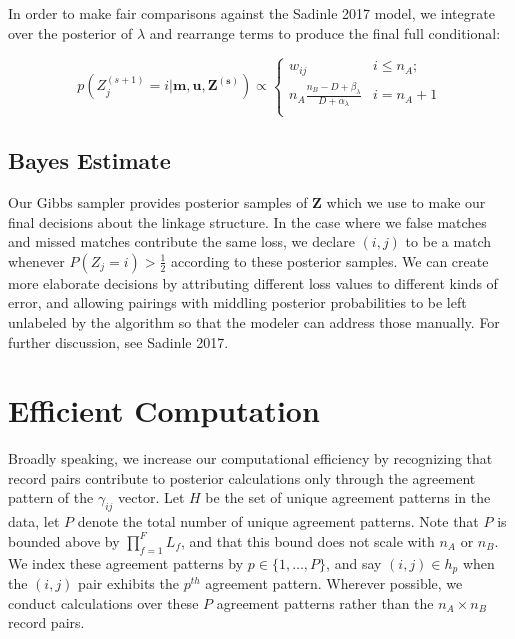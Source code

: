 \documentclass[
  12pt,
]{article}
\begin{document}
In order to make fair comparisons against the Sadinle 2017 model, we
integrate over the posterior of \(\lambda\) and rearrange terms to
produce the final full conditional:

\[p\left(Z_j^{(s+1)}  = i| \mathbf{m}, \mathbf{u}, \mathbf{Z^{(s)}}\right) \propto
\begin{cases} 
    w_{ij}  & i \leq n_A; \\
     n_A \frac{n_B - D + \beta_{\lambda}}{D + \alpha_{\lambda}} & i  = n_A + 1 \\
\end{cases}\]

\hypertarget{bayes-estimate}{%
\subsection{Bayes Estimate}\label{bayes-estimate}}

Our Gibbs sampler provides posterior samples of \(\mathbf{Z}\) which we
use to make our final decisions about the linkage structure. In the case
where we false matches and missed matches contribute the same loss, we
declare \((i,j)\) to be a match whenever \(P(Z_j = i) > \frac{1}{2}\)
according to these posterior samples. We can create more elaborate
decisions by attributing different loss values to different kinds of
error, and allowing pairings with middling posterior probabilities to be
left unlabeled by the algorithm so that the modeler can address those
manually. For further discussion, see Sadinle 2017.

\hypertarget{efficient-computation}{%
\section{Efficient Computation}\label{efficient-computation}}

Broadly speaking, we increase our computational efficiency by
recognizing that record pairs contribute to posterior calculations only
through the agreement pattern of the \(\gamma_{ij}\) vector. Let \(H\)
be the set of unique agreement patterns in the data, let \(P\) denote
the total number of unique agreement patterns. Note that \(P\) is
bounded above by \(\prod_{f=1}^F L_f\), and that this bound does not
scale with \(n_A\) or \(n_B\). We index these agreement patterns by
\(p \in \{1, \ldots, P\}\), and say \((i,j) \in h_p\) when the \((i,j)\)
pair exhibits the \(p^{th}\) agreement pattern. Wherever possible, we
conduct calculations over these \(P\) agreement patterns rather than the
\(n_A \times n_B\) record pairs.
\end{document}
